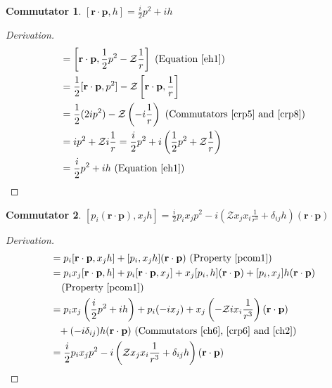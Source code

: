 \documentclass[12pt,a4paper]{report}
\theoremstyle{definition}
\newtheorem{commutator}{Commutator}[section]
\newenvironment{derivation}
  {\renewcommand\qedsymbol{$\square$}\begin{proof}[Derivation]}
  {\end{proof}}
\theoremstyle{remark}
\theoremstyle{remark}
\begin{document}
\begin{appendices}
\begin{commutator}\label{ch6}
$[\textbf{r}\cdot\textbf{p},h]=\frac{i}{2}p^2+i h$
\end{commutator}
\begin{derivation}
\begin{align*}
[\textbf{r}\cdot\textbf{p},h] &= \left[\textbf{r}\cdot\textbf{p},\frac{1}{2}p^2-\mathcal{Z}\frac{1}{r}\right] \text{ (Equation~\ref{eh1})} \\
&= \frac{1}{2}[\textbf{r}\cdot\textbf{p},p^2]-\mathcal{Z}\left[\textbf{r}\cdot\textbf{p},\frac{1}{r}\right] \\
&= \frac{1}{2}(2i p^2)-\mathcal{Z}\left(-i\frac{1}{r}\right) \text{ (Commutators~\ref{crp5} and~\ref{crp8})} \\
&= ip^2+\mathcal{Z}i\frac{1}{r} = \frac{i}{2}p^2+i\left(\frac{1}{2}p^2+\mathcal{Z}\frac{1}{r}\right) \\
&= \frac{i}{2}p^2+i h \text{ (Equation~\ref{eh1})}
\end{align*}
\end{derivation}

\begin{commutator}\label{ch7}
$[p_i(\textbf{r}\cdot\textbf{p}),x_jh]=\frac{i}{2}p_ix_jp^2-i \left(\mathcal{Z}x_jx_i\frac{1}{r^3}+\delta_{ij}h\right)(\textbf{r}\cdot\textbf{p})$
\end{commutator}
\begin{derivation}
\begin{align*}
[p_i(\textbf{r}\cdot\textbf{p}),x_jh] &= p_i[\textbf{r}\cdot\textbf{p},x_jh]+[p_i,x_jh](\textbf{r}\cdot\textbf{p}) \text{ (Property~\ref{pcom1})} \\
&= p_ix_j[\textbf{r}\cdot\textbf{p},h]+p_i[\textbf{r}\cdot\textbf{p},x_j]+x_j[p_i,h](\textbf{r}\cdot\textbf{p})+[p_i,x_j]h(\textbf{r}\cdot\textbf{p}) \\
&\phantom{=}\text{ (Property~\ref{pcom1})} \\
&= p_ix_j\left(\frac{i}{2}p^2+i h\right)+p_i(-i x_j)+x_j\left(-\mathcal{Z}i x_i\frac{1}{r^3}\right)(\textbf{r}\cdot\textbf{p}) \\
&\phantom{=}+(-i\delta_{ij})h(\textbf{r}\cdot\textbf{p}) \text{ (Commutators~\ref{ch6},~\ref{crp6} and~\ref{ch2})} \\
&= \frac{i}{2}p_ix_jp^2-i \left(\mathcal{Z}x_jx_i\frac{1}{r^3}+\delta_{ij}h\right)(\textbf{r}\cdot\textbf{p}) \\
\end{align*}
\end{derivation}


\end{appendices}
\end{document}

